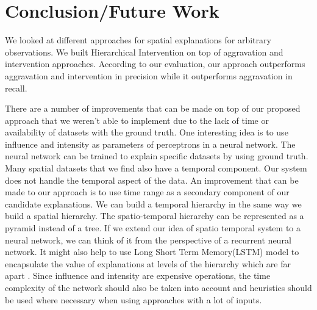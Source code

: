 \chapter{Conclusion/Future Work}
\label{chp:concl}
We looked at different approaches for spatial explanations for arbitrary observations. We built Hierarchical Intervention on top of aggravation and intervention approaches. According to our evaluation, our approach outperforms aggravation and intervention in precision while it outperforms aggravation in recall.

There are a number of improvements that can be made on top of our proposed approach that we weren't able to implement due to the lack of time or availability of datasets with the ground truth. One interesting idea is to use influence and intensity as parameters of perceptrons in a neural network\citep{grossberg1988nonlinear,widrow199030}. The neural network can be trained to explain specific datasets by using ground truth.
Many spatial datasets that we find also have a temporal component. Our system does not handle the temporal aspect of the data. An improvement that can be made to our approach is to use time range as a secondary component of our candidate explanations. We can build a temporal hierarchy in the same way we build a spatial hierarchy. The spatio-temporal hierarchy can be represented as a pyramid instead of a tree.
If we extend our idea of spatio temporal system to a neural network, we can think of it from the perspective of a recurrent neural network\citep{chung2016hierarchical}. It might also help to use Long Short Term Memory(LSTM) model to encapsulate the value of explanations at levels of the hierarchy which are far apart \citep{hochreiter1997long}.
Since influence and intensity are expensive operations, the time complexity of the network should also be taken into account and heuristics should be used where necessary when using approaches with a lot of inputs.
